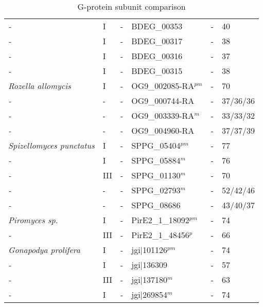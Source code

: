 \begin{table}[tbp]
\begin{tabular}{llllll}
  \emph{-} & I & - & BDEG\_00353 & - & 40 \\ 
  \emph{-} & I & - & BDEG\_00317 & - & 38 \\ 
  \emph{-} & I & - & BDEG\_00316 & - & 37 \\ 
  \emph{-} & I & - & BDEG\_00315 & - & 38 \\ 
  \emph{Rozella allomycis } & I & - & OG9\_002085-RA$^{pm}$ & - & 70 \\ 
  \emph{-} & - & - & OG9\_000744-RA & - & 37/36/36 \\ 
  \emph{-} & - & - & OG9\_003339-RA$^{m}$ & - & 33/33/32 \\ 
  \emph{-} & - & - & OG9\_004960-RA & - & 37/37/39 \\ 
  \emph{Spizellomyces punctatus } & I & - & SPPG\_05404$^{pm}$ & - & 77 \\ 
  \emph{-} & I & - & SPPG\_05884$^{m}$ & - & 76 \\ 
  \emph{-} & III & - & SPPG\_01130$^{m}$ & - & 70 \\ 
  \emph{-} & - & - & SPPG\_02793$^{m}$ & - & 52/42/46 \\ 
  \emph{-} & - & - & SPPG\_08686 & - & 43/40/37 \\ 
  \emph{Piromyces sp. } & I & - & PirE2\_1\_18092$^{pm}$ & - & 74 \\ 
  \emph{-} & III & - & PirE2\_1\_48456$^{p}$ & - & 66 \\ 
  \emph{Gonapodya prolifera } & I & - & jgi|101126$^{pm}$ & - & 74 \\ 
  \emph{-} & I & - & jgi|136309 & - & 57 \\ 
  \emph{-} & III & - & jgi|137180$^{m}$ & - & 63 \\ 
  \emph{-} & I & - & jgi|269854$^{m}$ & - & 74 \\ 
   \hline
\end{tabular}
\caption{G-protein subunit comparison} 
\label{tab:ChRhodA_Gcomp}
\end{table}
